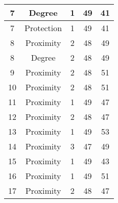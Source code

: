 \documentclass[results.tex]{subfiles}
\begin{document}
\begin{center}
\begin{tabular}{| c || c | c | c | c |}
            \hline
            7                       & Degree                       & 1                      & 49                      & 41                   \\
            \hline
            7                       & Protection                   & 1                      & 49                      & 41                   \\
            \hline
            8                       & Proximity                    & 2                      & 48                      & 49                   \\
            \hline
            8                       & Degree                       & 2                      & 48                      & 49                   \\
            \hline
            9                       & Proximity                    & 2                      & 48                      & 51                   \\
            \hline
            10                      & Proximity                    & 2                      & 48                      & 51                   \\
            \hline
            11                      & Proximity                    & 1                      & 49                      & 47                   \\
            \hline
            12                      & Proximity                    & 2                      & 48                      & 47                   \\
            \hline
            13                      & Proximity                    & 1                      & 49                      & 53                   \\
            \hline
            14                      & Proximity                    & 3                      & 47                      & 49                   \\
            \hline
            15                      & Proximity                    & 1                      & 49                      & 43                   \\
            \hline
            16                      & Proximity                    & 1                      & 49                      & 51                   \\
            \hline
            17                      & Proximity                    & 2                      & 48                      & 47                   \\

\end{tabular}
\end{center}
\end{document}
